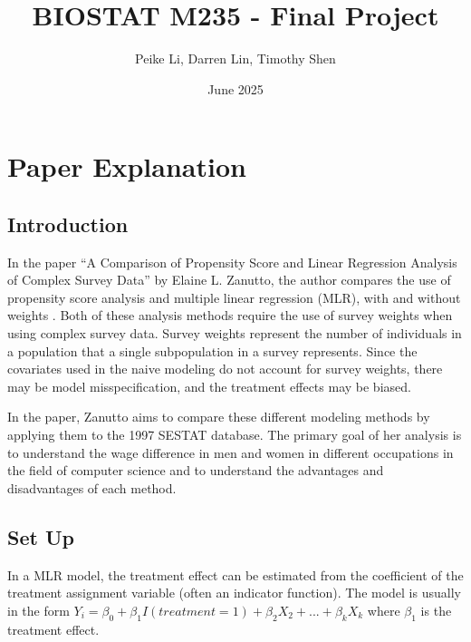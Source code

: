 \documentclass[12pt]{article}
\title{BIOSTAT M235 - Final Project}
\author{Peike Li, Darren Lin, Timothy Shen}
\date{June 2025}
\begin{document}
\doublespacing


\maketitle

\newpage

\section{Paper Explanation}

\subsection{Introduction} \label{subsec:intro}

In the paper “A Comparison of Propensity Score and Linear Regression Analysis of Complex Survey Data” by Elaine L. Zanutto, the author compares the use of propensity score analysis and multiple linear regression (MLR), with and without weights \cite{zanutto_2022}. Both of these analysis methods require the use of survey weights when using complex survey data. Survey weights represent the number of individuals in a population that a single subpopulation in a survey represents. Since the covariates used in the naive modeling do not account for survey weights, there may be model misspecification, and the treatment effects may be biased.

In the paper, Zanutto aims to compare these different modeling methods by applying them to the 1997 SESTAT database. The primary goal of her analysis is to understand the wage difference in men and women in different occupations in the field of computer science and to understand the advantages and disadvantages of each method.


\subsection{Set Up} \label{subsec:setup}

In a MLR model, the treatment effect can be estimated from the coefficient of the treatment assignment variable (often an indicator function). The model is usually in the form $Y_i = \beta_0 + \beta_1 I(treatment = 1) + \beta_2 X_2 + ... + \beta_k X_k$ where $\beta_1$ is the treatment effect.
\end{document}

